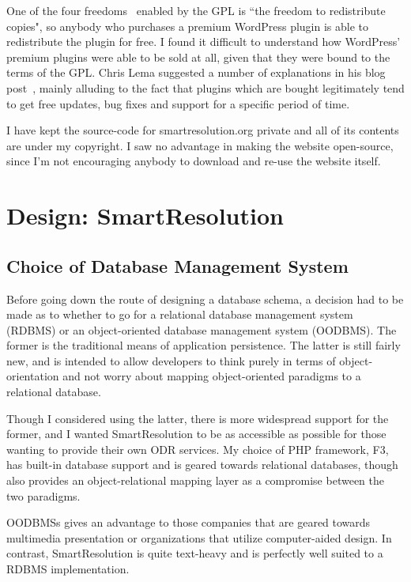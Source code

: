 One of the four freedoms~\cite{fourFreedoms} enabled by the GPL is ``the freedom to redistribute copies", so anybody who purchases a premium WordPress plugin is able to redistribute the plugin for free. I found it difficult to understand how WordPress' premium plugins were able to be sold at all, given that they were bound to the terms of the GPL. Chris Lema suggested a number of explanations in his blog post~\cite{chrisLema}, mainly alluding to the fact that plugins which are bought legitimately tend to get free updates, bug fixes and support for a specific period of time.

I have kept the source-code for smartresolution.org private and all of its contents are under my copyright. I saw no advantage in making the website open-source, since I'm not encouraging anybody to download and re-use the website itself.

\section{Design: SmartResolution}

\subsection{Choice of Database Management System}

Before going down the route of designing a database schema, a decision had to be made as to whether to go for a relational database management system (RDBMS) or an object-oriented database management system (OODBMS). The former is the traditional means of application persistence. The latter is still fairly new, and is intended to allow developers to think purely in terms of object-orientation and not worry about mapping object-oriented paradigms to a relational database.

Though I considered using the latter, there is more widespread support for the former, and I wanted SmartResolution to be as accessible as possible for those wanting to provide their own ODR services. My choice of PHP framework, F3, has built-in database support and is geared towards relational databases, though also provides an object-relational mapping layer as a compromise between the two paradigms.

OODBMSs gives an advantage to those companies that are geared towards multimedia presentation or organizations that utilize computer-aided design. In contrast, SmartResolution is quite text-heavy and is perfectly well suited to a RDBMS implementation.~\cite{oodbms}

